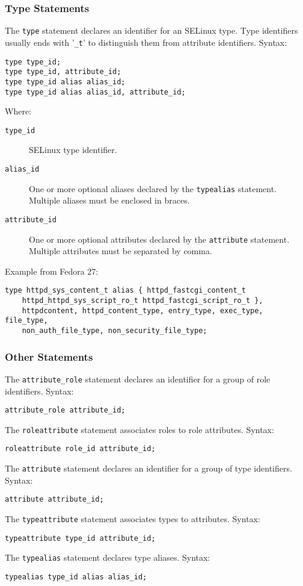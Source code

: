\subsubsection{Type Statements}
The \texttt{type} statement declares an identifier for an SELinux type. Type
identifiers usually ends with '\texttt{\_t}' to distinguish them from attribute
identifiers. Syntax:
\begin{lstlisting}[language=te]
type type_id;
type type_id, attribute_id;
type type_id alias alias_id;
type type_id alias alias_id, attribute_id;
\end{lstlisting}
Where:
\begin{description}
    \item [\texttt{type\_id}] SELinux type identifier.
    \item [\texttt{alias\_id}] One or more optional aliases declared by the
        \texttt{typealias} statement. Multiple aliases must be enclosed in
        braces.
    \item [\texttt{attribute\_id}] One or more optional attributes declared by
        the \texttt{attribute} statement. Multiple attributes must be separated
        by comma.
\end{description}
Example from Fedora 27:
\begin{lstlisting}[language=te]
type httpd_sys_content_t alias { httpd_fastcgi_content_t
    httpd_httpd_sys_script_ro_t httpd_fastcgi_script_ro_t },
    httpdcontent, httpd_content_type, entry_type, exec_type, file_type,
    non_auth_file_type, non_security_file_type;
\end{lstlisting}

\subsubsection{Other Statements}
The \texttt{attribute\_role} statement declares an identifier for a group of
role identifiers. Syntax:
\begin{lstlisting}[language=te]
attribute_role attribute_id;
\end{lstlisting}
The \texttt{roleattribute} statement associates roles to role attributes.
Syntax:
\begin{lstlisting}[language=te]
roleattribute role_id attribute_id;
\end{lstlisting}
The \texttt{attribute} statement declares an identifier for a group of type
identifiers. Syntax:
\begin{lstlisting}[language=te]
attribute attribute_id;
\end{lstlisting}
The \texttt{typeattribute} statement associates types to attributes. Syntax:
\begin{lstlisting}[language=te]
typeattribute type_id attribute_id;
\end{lstlisting}
The \texttt{typealias} statement declares type aliases. Syntax:
\begin{lstlisting}[language=te]
typealias type_id alias alias_id;
\end{lstlisting}


